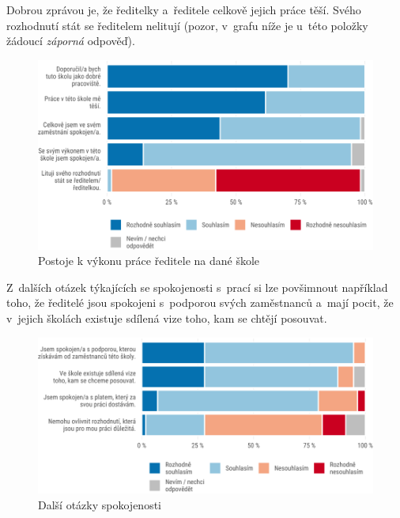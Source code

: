 \documentclass[12pt,a4paper,]{report}
\begin{document}
Dobrou zprávou je, že ředitelky a~ředitele celkově jejich práce těší. Svého rozhodnutí stát se ředitelem nelitují (pozor, v~grafu níže je u~této položky žádoucí \emph{záporná} odpověď).

\begin{figure}

{\centering \includegraphics[width=\textwidth]{figs/satisDir-1} 

}

\caption{Postoje k výkonu práce ředitele na dané škole}\label{fig:satisDir}
\end{figure}

Z~dalších otázek týkajících se spokojenosti s~prací si lze povšimnout například toho, že ředitelé jsou spokojeni s~podporou svých zaměstnanců a~mají pocit, že v~jejich školách existuje sdílená vize toho, kam se chtějí posouvat.

\begin{figure}

{\centering \includegraphics[width=\textwidth]{figs/satisOther-1} 

}

\caption{Další otázky spokojenosti}\label{fig:satisOther}
\end{figure}
\end{document}
